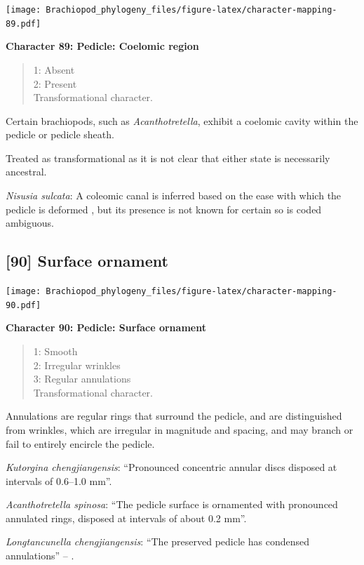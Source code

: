 \documentclass[openany]{book}
\theoremstyle{definition}
\theoremstyle{definition}
\theoremstyle{definition}
\theoremstyle{remark}
\begin{document}
\texttt{[image: Brachiopod\_phylogeny\_files/figure-latex/character-mapping-89.pdf]}

\textbf{Character 89: Pedicle: Coelomic region}

\begin{quote}
1: Absent\\
2: Present\\
Transformational character.
\end{quote}

Certain brachiopods, such as \emph{Acanthotretella}, exhibit a coelomic
cavity within the pedicle or pedicle sheath.

Treated as transformational as it is not clear that either state is
necessarily ancestral.

\emph{Nisusia sulcata}: A coleomic canal is inferred based on the ease
with which the pedicle is deformed
\citep{Holmer2018Evolutionarysignificance}, but its presence is not
known for certain so is coded ambiguous.

\hypertarget{surface-ornament-1}{%
\subsection*{{[}90{]} Surface ornament}\label{surface-ornament-1}}

\texttt{[image: Brachiopod\_phylogeny\_files/figure-latex/character-mapping-90.pdf]}

\textbf{Character 90: Pedicle: Surface ornament}

\begin{quote}
1: Smooth\\
2: Irregular wrinkles\\
3: Regular annulations\\
Transformational character.
\end{quote}

Annulations are regular rings that surround the pedicle, and are
distinguished from wrinkles, which are irregular in magnitude and
spacing, and may branch or fail to entirely encircle the pedicle.

\emph{Kutorgina chengjiangensis}: ``Pronounced concentric annular discs
disposed at intervals of 0.6--1.0 mm''.

\emph{Acanthotretella spinosa}: ``The pedicle surface is ornamented with
pronounced annulated rings, disposed at intervals of about 0.2 mm''.

\emph{Longtancunella chengjiangensis}: ``The preserved pedicle has
condensed annulations'' -- \citet{Zhang2011Theexceptionally}.
\end{document}
